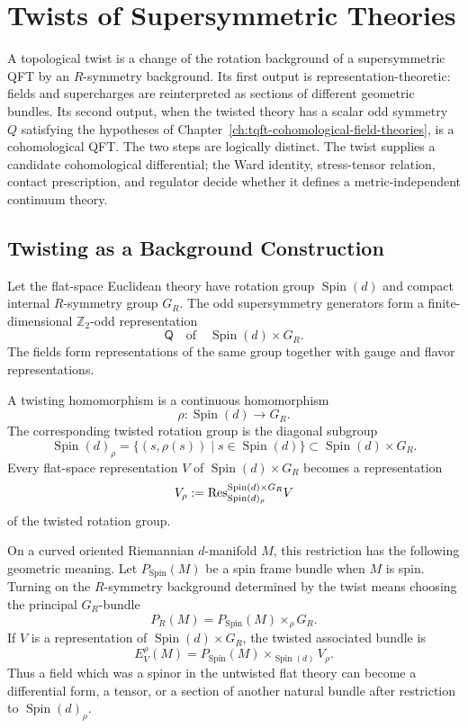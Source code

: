\chapter{Twists of Supersymmetric Theories}
\label{ch:tqft-twists-of-supersymmetric-theories}

\ConventionsEuclidean

A topological twist is a change of the rotation background of a
supersymmetric QFT by an \(R\)-symmetry background.  Its first output is
representation-theoretic: fields and supercharges are reinterpreted as
sections of different geometric bundles.  Its second output, when the
twisted theory has a scalar odd symmetry \(Q\) satisfying the hypotheses of
Chapter~\ref{ch:tqft-cohomological-field-theories}, is a cohomological QFT.
The two steps are logically distinct.  The twist supplies a candidate
cohomological differential; the Ward identity, stress-tensor relation,
contact prescription, and regulator decide whether it defines a
metric-independent continuum theory.

\section{Twisting as a Background Construction}

Let the flat-space Euclidean theory have rotation group
\(\operatorname{Spin}(d)\) and compact internal \(R\)-symmetry group \(G_R\).
The odd supersymmetry generators form a finite-dimensional
\(\mathbb Z_2\)-odd representation
\[
  \mathsf Q
  \quad\text{of}\quad
  \operatorname{Spin}(d)\times G_R .
\]
The fields form representations of the same group together with gauge and
flavor representations.

\begin{definition}
A twisting homomorphism is a continuous homomorphism
\[
  \rho:\operatorname{Spin}(d)\longrightarrow G_R .
\]
The corresponding twisted rotation group is the diagonal subgroup
\[
  \operatorname{Spin}(d)_\rho
  =
  \{(s,\rho(s))\mid s\in\operatorname{Spin}(d)\}
  \subset \operatorname{Spin}(d)\times G_R .
\]
Every flat-space representation \(V\) of
\(\operatorname{Spin}(d)\times G_R\) becomes a representation
\[
  V_\rho
  :=
  {\rm Res}^{\operatorname{Spin}(d)\times G_R}_{\operatorname{Spin}(d)_\rho}V
\]
of the twisted rotation group.
\end{definition}

On a curved oriented Riemannian \(d\)-manifold \(M\), this restriction has the
following geometric meaning.  Let \(P_{\operatorname{Spin}}(M)\) be a spin
frame bundle when \(M\) is spin.  Turning on the \(R\)-symmetry background
determined by the twist means choosing the principal \(G_R\)-bundle
\[
  P_R(M)=P_{\operatorname{Spin}}(M)\times_{\rho}G_R .
\]
If \(V\) is a representation of \(\operatorname{Spin}(d)\times G_R\), the
twisted associated bundle is
\[
  E_V^\rho(M)
  =
  P_{\operatorname{Spin}}(M)\times_{\operatorname{Spin}(d)} V_\rho .
\]
Thus a field which was a spinor in the untwisted flat theory can become a
differential form, a tensor, or a section of another natural bundle after
restriction to \(\operatorname{Spin}(d)_\rho\).

